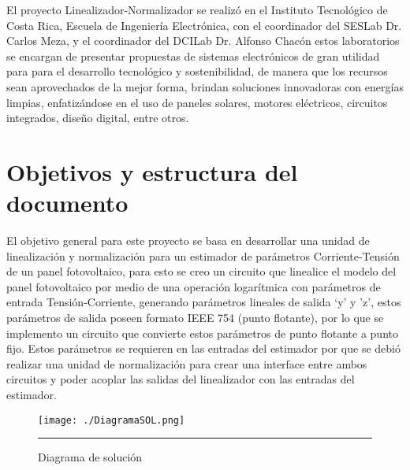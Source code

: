El proyecto Linealizador-Normalizador se realizó en el Instituto Tecnológico de Costa Rica, Escuela de Ingeniería Electrónica, con el coordinador del SESLab Dr. Carlos Meza, y el coordinador del DCILab Dr. Alfonso Chacón estos laboratorios se encargan de presentar propuestas de sistemas electrónicos de gran utilidad para  para el desarrollo tecnológico y sostenibilidad, de manera que los recursos sean aprovechados de la mejor forma, brindan soluciones innovadoras con energías limpias, enfatizándose en el uso de paneles solares, motores eléctricos, circuitos integrados, diseño digital, entre otros. 


\section{Objetivos y estructura del documento}


El objetivo general para este proyecto se basa en desarrollar una unidad de linealización y normalización para un estimador de parámetros Corriente-Tensión de un panel fotovoltaico, para esto se creo un circuito que linealice el modelo del panel fotovoltaico por medio de una operación logarítmica con parámetros de entrada Tensión-Corriente, generando parámetros lineales de salida ‘y’ y ’z’, estos parámetros de salida poseen formato IEEE 754 (punto flotante), por lo que se implemento un circuito que convierte estos parámetros de punto flotante a punto fijo. Estos parámetros se requieren en las entradas del estimador por que se debió realizar una unidad de normalización para crear una interface entre ambos circuitos y poder acoplar las salidas del linealizador con las entradas del estimador.

 \begin{figure}[H]
  \centering
    \texttt{[image: ./DiagramaSOL.png]}
    \rule{35em}{0.5pt}
  \caption[Diagrama de solución]{Diagrama de solución}
  \label{fig:DSOL}
\end{figure}





